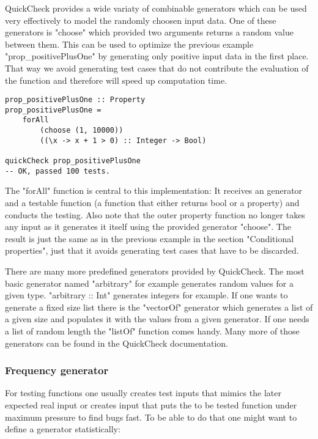 \documentclass[a4paper, 12pt]{article} %
\begin{document}
QuickCheck provides a wide variaty of combinable generators which can be used very effectively to model the randomly choosen input data. One of these generators is "choose" which provided two arguments returns a random value between them. This can be used to optimize the previous example "prop\_positivePlusOne" by generating only positive input data in the first place. That way we avoid generating test cases that do not contribute the evaluation of the function and therefore will speed up computation time. 

\begin{verbatim}
prop_positivePlusOne :: Property
prop_positivePlusOne = 
    forAll
        (choose (1, 10000))
        ((\x -> x + 1 > 0) :: Integer -> Bool)

quickCheck prop_positivePlusOne
-- OK, passed 100 tests.
\end{verbatim}

The "forAll" function is central to this implementation: It receives an generator and a testable function (a function that either returns bool or a property) and conducts the testing. Also note that the outer property function no longer takes any input as it generates it itself using the provided generator "choose". The result is just the same as in the previous example in the section "Conditional properties", just that it avoids generating test cases that have to be discarded.

There are many more predefined generators provided by QuickCheck. The most basic generator named "arbitrary" for example generates random values for a given type. "arbitrary :: Int" generates integers for example. If one wants to generate a fixed size list there is the "vectorOf" generator which generates a list of a given size and populates it with the values from a given generator. If one needs a list of random length the "listOf" function comes handy. Many more of those generators can be found in the QuickCheck documentation. \cite{documentation}

\subsubsection{Frequency generator}

For testing functions one usually creates test inputs that mimics the later expected real input or creates input that puts the to be tested function under maximum pressure to find bugs fast. To be able to do that one might want to define a generator statistically:
\end{document}
